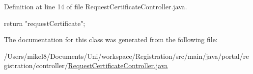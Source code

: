 Definition at line 14 of file RequestCertificateController.java.


\begin{DoxyCode}
                                                                {
                return "requestCertificate";
        }
\end{DoxyCode}


The documentation for this class was generated from the following file:\begin{DoxyCompactItemize}
\item 
/Users/mikel8/Documents/Uni/workspace/Registration/src/main/java/portal/registration/controller/\hyperlink{RequestCertificateController_8java}{RequestCertificateController.java}\end{DoxyCompactItemize}
